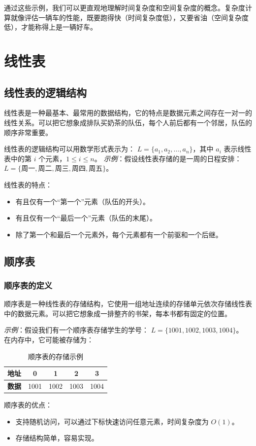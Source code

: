 \documentclass[lang=cn,newtx,10pt,scheme=chinese]{../elegantbook}
\begin{document}
通过这些示例，我们可以更直观地理解时间复杂度和空间复杂度的概念。复杂度计算就像评估一辆车的性能，既要跑得快（时间复杂度低），又要省油（空间复杂度低），才能称得上是一辆好车。

\chapter{线性表}

\section{线性表的逻辑结构}
线性表是一种最基本、最常用的数据结构，它的特点是数据元素之间存在一对一的线性关系。可以把它想象成排队买奶茶的队伍，每个人前后都有一个邻居，队伍的顺序非常重要。

线性表的逻辑结构可以用数学形式表示为：
$L = \{a_1, a_2, \dots, a_n\}$，其中 $a_i$ 表示线性表中的第 $i$ 个元素，$1 \leq i \leq n$。
\textit{示例}：假设线性表存储的是一周的日程安排：
$L = \{\text{周一}, \text{周二}, \text{周三}, \text{周四}, \text{周五}\}$。

线性表的特点：
\begin{itemize}
    \item 有且仅有一个“第一个”元素（队伍的开头）。
    \item 有且仅有一个“最后一个”元素（队伍的末尾）。
    \item 除了第一个和最后一个元素外，每个元素都有一个前驱和一个后继。
\end{itemize}

\section{顺序表}

\subsection{顺序表的定义}
顺序表是一种线性表的存储结构，它使用一组地址连续的存储单元依次存储线性表中的数据元素。可以把它想象成一排整齐的书架，每本书都有固定的位置。

\textit{示例}：假设我们有一个顺序表存储学生的学号：
$L = \{1001, 1002, 1003, 1004\}$。
在内存中，它可能被存储为：
\begin{table}[h]
  \centering
  \begin{tabular}{|c|c|c|c|c|}
  \hline
  \textbf{地址} & 0 & 1 & 2 & 3 \\
  \hline
  \textbf{数据} & 1001 & 1002 & 1003 & 1004 \\
  \hline
  \end{tabular}
  \caption{顺序表的存储示例}
  \label{tab:sequence_table}
\end{table}
顺序表的优点：
\begin{itemize}
    \item 支持随机访问，可以通过下标快速访问任意元素，时间复杂度为 $O(1)$。
    \item 存储结构简单，容易实现。
\end{itemize}
\end{document}
